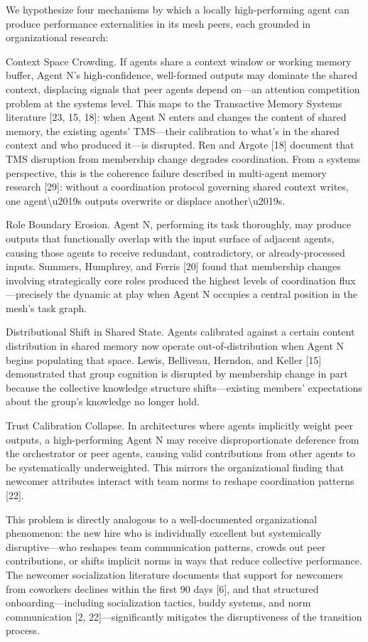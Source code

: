We hypothesize four mechanisms by which a locally high-performing agent can produce performance externalities in its mesh peers, each grounded in organizational research:

Context Space Crowding. If agents share a context window or working memory buffer, Agent N's high-confidence, well-formed outputs may dominate the shared context, displacing signals that peer agents depend on---an attention competition problem at the systems level. This maps to the Transactive Memory Systems literature [23, 15, 18]: when Agent N enters and changes the content of shared memory, the existing agents' TMS---their calibration to what's in the shared context and who produced it---is disrupted. Ren and Argote [18] document that TMS disruption from membership change degrades coordination. From a systems perspective, this is the coherence failure described in multi-agent memory research [29]: without a coordination protocol governing shared context writes, one agent\textbackslash{}u2019s outputs overwrite or displace another\textbackslash{}u2019s.

Role Boundary Erosion. Agent N, performing its task thoroughly, may produce outputs that functionally overlap with the input surface of adjacent agents, causing those agents to receive redundant, contradictory, or already-processed inputs. Summers, Humphrey, and Ferris [20] found that membership changes involving strategically core roles produced the highest levels of coordination flux---precisely the dynamic at play when Agent N occupies a central position in the mesh's task graph.

Distributional Shift in Shared State. Agents calibrated against a certain content distribution in shared memory now operate out-of-distribution when Agent N begins populating that space. Lewis, Belliveau, Herndon, and Keller [15] demonstrated that group cognition is disrupted by membership change in part because the collective knowledge structure shifts---existing members' expectations about the group's knowledge no longer hold.

Trust Calibration Collapse. In architectures where agents implicitly weight peer outputs, a high-performing Agent N may receive disproportionate deference from the orchestrator or peer agents, causing valid contributions from other agents to be systematically underweighted. This mirrors the organizational finding that newcomer attributes interact with team norms to reshape coordination patterns [22].

This problem is directly analogous to a well-documented organizational phenomenon: the new hire who is individually excellent but systemically disruptive---who reshapes team communication patterns, crowds out peer contributions, or shifts implicit norms in ways that reduce collective performance. The newcomer socialization literature documents that support for newcomers from coworkers declines within the first 90 days [6], and that structured onboarding---including socialization tactics, buddy systems, and norm communication [2, 22]---significantly mitigates the disruptiveness of the transition process.

